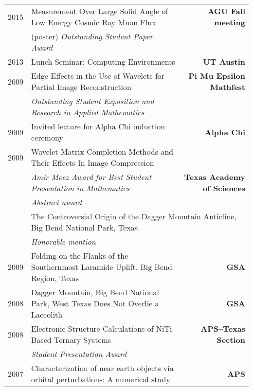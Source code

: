 \documentclass[10pt,letterpaper,english]{moderncv}
\begin{document}
\begin{tabularx}{\textwidth}{p{.35in}X>{\bfseries}r}
	
	2015 & Measurement Over Large Solid Angle of Low Energy Cosmic Ray Muon Flux &  AGU Fall meeting \\
	 & (poster) \emph{Outstanding Student Paper Award} & \\
	 2013 & Lunch Seminar: Computing Environments & UT Austin \\
	 2009 & Edge Effects in the Use of Wavelets for Partial Image Reconstruction & Pi Mu Epsilon Mathfest \\
	 & \emph{Outstanding Student Exposition and Research in Applied Mathematics} & \\
	 
	 2009 & Invited lecture for Alpha Chi induction ceremony & Alpha Chi  \\
	 
	 2009 & Wavelet Matrix Completion Methods and Their Effects In Image Compression &  \\
	  & \emph{Amir Moez Award for Best Student Presentation in Mathematics} & Texas Academy of Sciences \\
	  & \emph{Abstract award} & \\
	  & \multicolumn{2}{l}{The Controversial Origin of the Dagger Mountain Anticline, Big Bend National Park, Texas}  \\
	  & \emph{Honorable mention} & \\
	  
	  
	  2009 & Folding on the Flanks of the Southernmost Laramide Uplift, Big Bend Region, Texas & GSA \\[1em]
	  
	  2008 & Dagger Mountain, Big Bend National Park, West Texas Does Not Overlie a Laccolith & GSA \\[1em]
	 
	 2008 & Electronic Structure Calculations of NiTi Based Ternary Systems  & APS--Texas Section \\
	 & \emph{Student Presentation Award} & \\
	 
	 2007 & Characterization of near earth objects via orbital perturbations: A numerical study & APS
	 
\end{tabularx}



\end{document}
